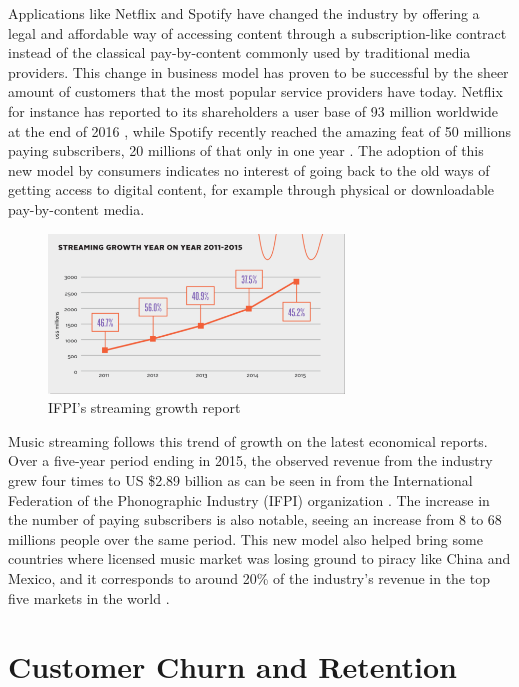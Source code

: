 \documentclass{kththesis}
\begin{document}
	Applications like Netflix and Spotify have changed the industry by offering a legal and affordable way of accessing content through a subscription-like contract instead of the classical pay-by-content commonly used by traditional media providers. This change in business model has proven to be successful by the sheer amount of customers that the most popular service providers have today. Netflix for instance has reported to its shareholders a user base of 93 million worldwide at the end of 2016 \citep{netflixsh}, while Spotify recently reached the amazing feat of 50 millions paying subscribers, 20 millions of that only in one year \citep{spotifypress}. The adoption of this new model by consumers indicates no interest of going back to the old ways of getting access to digital content, for example through physical or downloadable pay-by-content media.

	\begin{figure}[h]
    \centering
    \includegraphics[width=0.7\textwidth, natwidth=580bp, natheight=313bp]{figures/ifpi_stream_growth.png}
    \caption{IFPI's streaming growth report}
    \label{fig:ifpi-growth-report}
\end{figure}

	Music streaming follows this trend of growth on the latest economical reports. Over a five-year period ending in 2015, the observed revenue from the industry grew four times to US \$2.89 billion as can be seen in  from the International Federation of the Phonographic Industry (IFPI) organization \citep{ifpi}. The increase in the number of paying subscribers is also notable, seeing an increase from 8 to 68 millions people over the same period. This new model also helped bring some countries where licensed music market was losing ground to piracy like China and Mexico, and it corresponds to around 20\% of the industry's revenue in the top five markets in the world \citep{ifpi}. 
	  
\section{Customer Churn and Retention} 
\end{document}
